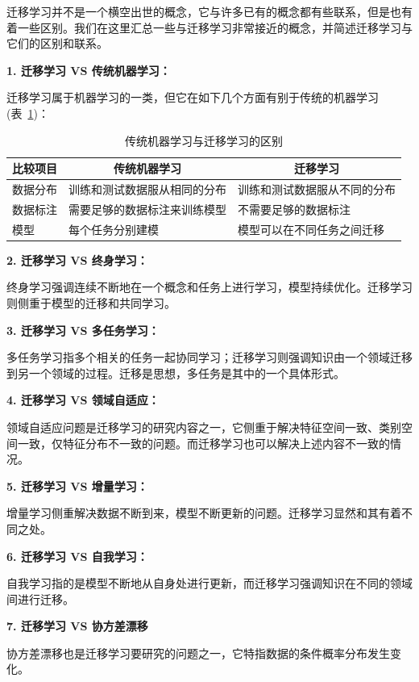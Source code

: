 迁移学习并不是一个横空出世的概念，它与许多已有的概念都有些联系，但是也有着一些区别。我们在这里汇总一些与迁移学习非常接近的概念，并简述迁移学习与它们的区别和联系。

\textbf{1. 迁移学习 VS 传统机器学习：}

迁移学习属于机器学习的一类，但它在如下几个方面有别于传统的机器学习(表~\ref{tb-introduction-machinelearning})：

\begin{table}[htbp]
\centering
\caption{传统机器学习与迁移学习的区别}
\label{tb-introduction-machinelearning}
\begin{tabular}{|l|l|l|}
\hline
\multicolumn{1}{|c|}{\textbf{比较项目}} & \multicolumn{1}{c|}{\textbf{传统机器学习}} & \multicolumn{1}{c|}{\textbf{迁移学习}} \\ \hline
数据分布 & 训练和测试数据服从相同的分布 & 训练和测试数据服从不同的分布 \\ \hline
数据标注 & 需要足够的数据标注来训练模型 & 不需要足够的数据标注 \\ \hline
模型 & 每个任务分别建模 & 模型可以在不同任务之间迁移 \\ \hline
\end{tabular}
\end{table}

\textbf{2. 迁移学习 VS 终身学习：}

终身学习强调连续不断地在一个概念和任务上进行学习，模型持续优化。迁移学习则侧重于模型的迁移和共同学习。

\textbf{3. 迁移学习 VS 多任务学习：}

多任务学习指多个相关的任务一起协同学习；迁移学习则强调知识由一个领域迁移到另一个领域的过程。迁移是思想，多任务是其中的一个具体形式。

\textbf{4. 迁移学习 VS 领域自适应：}

领域自适应问题是迁移学习的研究内容之一，它侧重于解决特征空间一致、类别空间一致，仅特征分布不一致的问题。而迁移学习也可以解决上述内容不一致的情况。

\textbf{5. 迁移学习 VS 增量学习：}

增量学习侧重解决数据不断到来，模型不断更新的问题。迁移学习显然和其有着不同之处。

\textbf{6. 迁移学习 VS 自我学习：}

自我学习指的是模型不断地从自身处进行更新，而迁移学习强调知识在不同的领域间进行迁移。

\textbf{7. 迁移学习 VS 协方差漂移}

协方差漂移也是迁移学习要研究的问题之一，它特指数据的条件概率分布发生变化。

